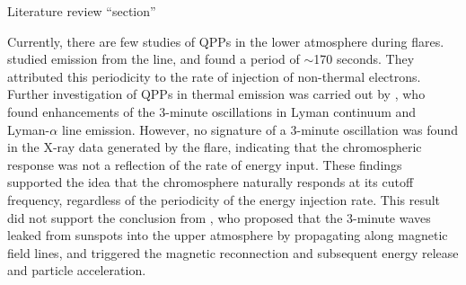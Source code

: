 
%
%
%



Literature review ``section''



Currently, there are few studies of QPPs in the lower atmosphere during flares.
\citep{Brosius2016} studied emission from the  line, and found
a period of $\sim$170 seconds. They
attributed this periodicity to the rate of injection of
non-thermal electrons.
Further investigation of QPPs in thermal emission was carried out by
\cite{Milligan2017}, who found enhancements of the 3-minute oscillations
in Lyman continuum and Lyman-$\alpha$ line emission.
However, no signature of a 3-minute oscillation was found in
the X-ray data generated by the flare, indicating
that the chromospheric response was not a
reflection of the rate of energy input.
These findings supported the idea that the chromosphere naturally
responds at its cutoff frequency, regardless of the periodicity of the
energy injection rate.
This result did not support the conclusion from
\cite{Sych2009}, who
proposed that the 3-minute waves leaked from sunspots into the upper
atmosphere by propagating along magnetic field lines, and triggered
the magnetic reconnection and subsequent energy release and particle
acceleration.



